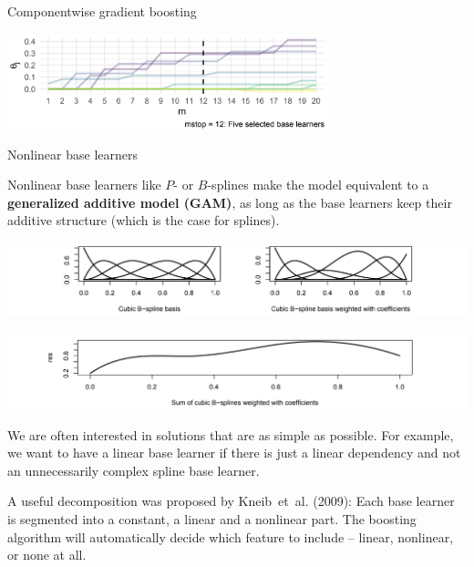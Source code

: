 \begin{vbframe}{Componentwise gradient boosting}
\begin{center}
\includegraphics[width=0.7\textwidth]{figure_man/mstop12.png}
\end{center}

\end{vbframe}

\begin{vbframe}{Nonlinear base learners}

Nonlinear base learners like $P$- or $B$-splines make the model equivalent to a \textbf{generalized additive model (GAM)}, as long as the base learners keep their additive structure (which is the case for splines).
\vspace{0.5cm}

\begin{center}
\includegraphics[width=1\textwidth]{figure_man/NBL01.png}
\end{center}


\begin{center}
\includegraphics[width=1\textwidth]{figure_man/NBL02.png}
\end{center}

\framebreak

We are often interested in solutions that are as simple as possible. For example, we want to have a linear base learner if there is just a linear dependency and not an unnecessarily complex spline base learner.

\lz

A useful decomposition was proposed by Kneib~et~al. (2009): Each base learner is segmented into a constant, a linear and a nonlinear part. The boosting algorithm will automatically decide which feature to include -- linear, nonlinear, or none at all.


\end{vbframe}
